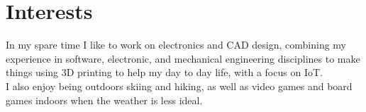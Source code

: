 \documentclass[letterpaper]{deedy-resume} %
\begin{document}
\begin{minipage}[t]{0.655\textwidth}
\sectionspace %

\vspace{-0.5em}
\section{Interests} 

In my spare time I like to work on electronics and CAD design, combining my experience in software, electronic, and mechanical engineering disciplines to make things using 3D printing to help my day to day life, with a focus on IoT.\\
\vspace{5pt}
I also enjoy being outdoors skiing and hiking, as well as video games and board games indoors when the weather is less ideal.

\sectionspace %

\end{minipage} %








\end{document}
